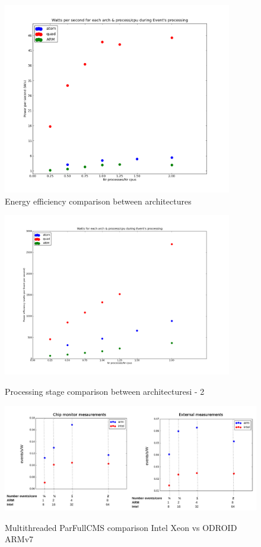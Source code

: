 \begin{figure}[h!]
  \centering
    \includegraphics[width=100mm]{"img/aalto/aalto_all"}
    \caption{Energy efficiency comparison between architectures}
    \label{fig:aalto_efficiency_comparison}
\end{figure}



\begin{figure}[h!]
  \centering
    \includegraphics[width=100mm]{"img/aalto/aalto_all2"}
    \label{fig:nf_ss}
    \caption{Processing stage comparison between architecturesi - 2}
\end{figure}


\begin{figure}[h!]
  \centering
    \includegraphics[width=150mm]{"img/acat/results1"}
    \label{fig:nf_ss}
    \caption{Multithreaded ParFullCMS comparison Intel Xeon vs ODROID ARMv7}
\end{figure}

